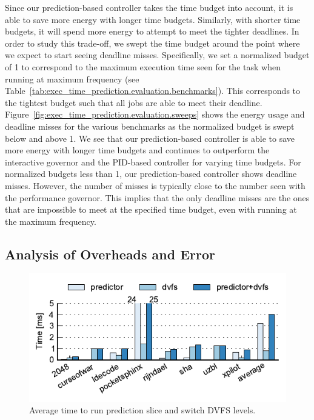 Since our prediction-based controller takes the time budget into account, it is
able to save more energy with longer time budgets. Similarly, with shorter time
budgets, it will spend more energy to attempt to meet the tighter deadlines.
In order to study this trade-off, we swept the time budget around the point
where we expect to start seeing deadline misses. Specifically, we set a
normalized budget of 1 to correspond to the maximum execution time seen for the
task when running at maximum frequency (see
Table~\ref{tab:exec_time_prediction.evaluation.benchmarks}). This corresponds
to the tightest budget such that all jobs are able to meet their deadline.
Figure~\ref{fig:exec_time_prediction.evaluation.sweeps} shows the energy usage
and deadline misses for the various benchmarks as the normalized budget is
swept below and above 1.  We see that our prediction-based controller is able
to save more energy with longer time budgets and continues to outperform the
interactive governor and the PID-based controller for varying time budgets.
For normalized budgets less than 1, our prediction-based controller shows
deadline misses. However, the number of misses is typically close to the number
seen with the performance governor.  This implies that the only deadline misses
are the ones that are impossible to meet at the specified time budget, even
with running at the maximum frequency.

\subsection{Analysis of Overheads and Error}
\label{sec:exec_time_prediction.evaluation.overheads}

\begin{figure}
  \begin{center}
    \includegraphics{exec_time_prediction/data/overhead_time.pdf}
    \caption{Average time to run prediction slice and switch DVFS levels.}
    \label{fig:exec_time_prediction.evaluation.overhead_time}
  \end{center}
\end{figure}


